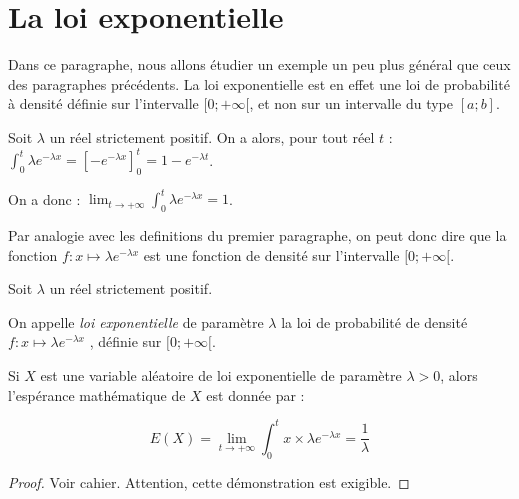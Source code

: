 \section{La loi exponentielle}\label{la-loi-exponentielle}

Dans ce paragraphe, nous allons étudier un exemple un peu plus général
que ceux des paragraphes précédents. La loi exponentielle est en effet
une loi de probabilité à densité définie sur l'intervalle
$[0;+\infty[$, et non sur un intervalle du type
\([a;b]\).

Soit \(\lambda\) un réel strictement positif. On a alors, pour tout réel
\(t\) :
\(\int_0^t \lambda e^{-\lambda x} = [-e^{-\lambda x}]_0^t = 1-e^{-\lambda t}\).

On a donc :
\(\lim_{t\rightarrow +\infty}\int_0^t \lambda e^{-\lambda x} = 1\).

Par analogie avec les definitions du premier paragraphe, on peut donc
dire que la fonction \(f:x\mapsto \lambda e^{-\lambda x}\) est une
fonction de densité sur l'intervalle $[0;+\infty[$.

\vspace{.5cm}

\begin{definition}{}
 
Soit \(\lambda\) un réel strictement positif.

On appelle \emph{loi exponentielle} de paramètre \(\lambda\) la loi de
probabilité de densité \(f:x\mapsto \lambda e^{-\lambda x}\) , définie
sur $[0;+\infty[$.

\end{definition}

\vspace{.5cm}

\begin{theoreme}{}
 
Si \(X\) est une variable aléatoire de loi exponentielle de paramètre
\(\lambda>0\), alors l'espérance mathématique de \(X\) est donnée par :

\[E(X)=\lim_{t\rightarrow+\infty}\int_0^t x \times \lambda e^{-\lambda x} =\frac{1}{\lambda}\]

\end{theoreme}

\begin{proof}
 Voir cahier. Attention, cette démonstration est
exigible.
\end{proof}

\vspace{.5cm}

